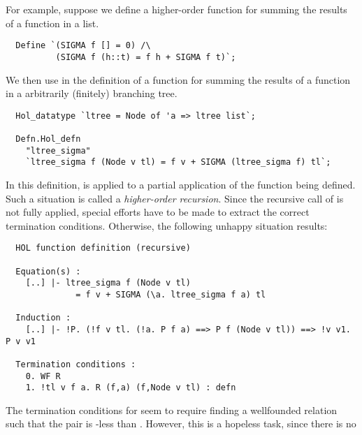 For example, suppose we define a higher-order function  for
summing the results of a function in a list.
%
\setcounter{sessioncount}{0}
\begin{session}
\begin{hol}
\begin{verbatim}
  Define `(SIGMA f [] = 0) /\
          (SIGMA f (h::t) = f h + SIGMA f t)`;
\end{verbatim}
\end{hol}
\end{session}
%
We then use  in the definition of a function for
summing the results of a function in a arbitrarily
(finitely) branching tree.
%
\begin{session}
\begin{hol}
\begin{verbatim}
  Hol_datatype `ltree = Node of 'a => ltree list`;

  Defn.Hol_defn
    "ltree_sigma"
    `ltree_sigma f (Node v tl) = f v + SIGMA (ltree_sigma f) tl`;
\end{verbatim}
\end{hol}
\end{session}
%
In this definition, \holtxt{SIGMA} is applied to a partial application
\holtxt{(ltree\_sigma f)} of the function being defined. Such a situation
is called a \emph{higher-order recursion}. Since the recursive call of
\holtxt{ltree\_sigma} is not fully applied, special efforts have
to be made to extract the correct termination conditions. Otherwise,
the following unhappy situation results:
%
\begin{session}
\begin{hol}
\begin{verbatim}
  HOL function definition (recursive)

  Equation(s) :
    [..] |- ltree_sigma f (Node v tl)
              = f v + SIGMA (\a. ltree_sigma f a) tl

  Induction :
    [..] |- !P. (!f v tl. (!a. P f a) ==> P f (Node v tl)) ==> !v v1. P v v1

  Termination conditions :
    0. WF R
    1. !tl v f a. R (f,a) (f,Node v tl) : defn
\end{verbatim}
\end{hol}
\end{session}
%
The termination conditions for  seem to
require finding a wellfounded relation  such that the pair
\holtxt{(f,a)} is \holtxt{R}-less than
. However, this is a hopeless task, since there is no
